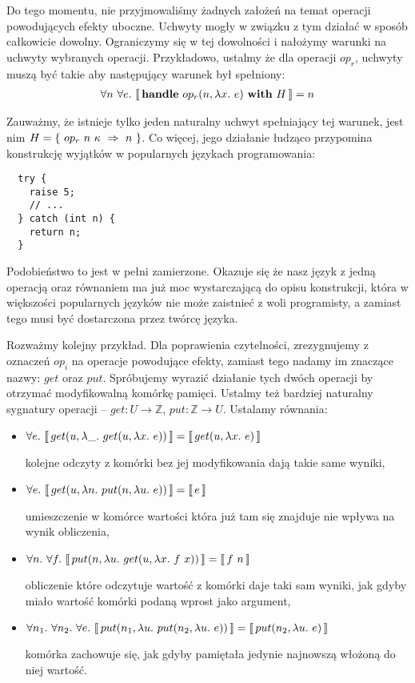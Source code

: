 \documentclass[shortabstract]{iithesis}
\begin{document}
Do tego momentu, nie przyjmowaliśmy żadnych założeń na temat operacji powodujących efekty uboczne. Uchwyty mogły w związku z tym działać w sposób całkowicie dowolny. Ograniczymy się w tej dowolności i nałożymy warunki na uchwyty wybranych operacji. Przykładowo, ustalmy że dla operacji \(op_r\), uchwyty muszą być takie aby następujący warunek był spełniony:
\begin{align}
  \forall n\ \forall e.\ \llbracket\, \mathbf{handle}\ op_r(n, \lambda x.\ e)\ \mathbf{with}\ H\, \rrbracket = n
\end{align}


Zauważmy, że istnieje tylko jeden naturalny uchwyt spełniający tej warunek, jest nim \(H = \{\ \hcase{op_r}{n\ \kappa}{n} \ \}\). Co więcej, jego działanie łudząco przypomina konstrukcję wyjątków w popularnych językach programowania:

\begin{lstlisting}
  try {
    raise 5;
    // ...
  } catch (int n) {
    return n;
  }
\end{lstlisting}

Podobieństwo to jest w pełni zamierzone. Okazuje się że nasz język z jedną operacją oraz równaniem ma już moc wystarczającą do opisu konstrukcji, która w większości popularnych języków nie może zaistnieć z woli programisty, a zamiast tego musi być dostarczona przez twórcę języka.

Rozważmy kolejny przykład. Dla poprawienia czytelności, zrezygnujemy z oznaczeń \(op_i\) na operacje powodujące efekty, zamiast tego nadamy im znaczące nazwy: \(get\) oraz \(put\). Spróbujemy wyrazić działanie tych dwóch operacji by otrzymać modyfikowalną komórkę pamięci. Ustalmy też bardziej naturalny sygnatury operacji -- \(get: U \rightarrow \mathbb{Z}\), \(put: \mathbb{Z} \rightarrow U\). Ustalamy równania:

\begin{itemize}
\item \(\forall e.\ \llbracket\, get(u, \lambda \_.\ get(u, \lambda x.\ e))\, \rrbracket = \llbracket\, get(u, \lambda x.\ e)\, \rrbracket\)

  kolejne odczyty z komórki bez jej modyfikowania dają takie same wyniki,
\item \(\forall e.\ \llbracket\, get(u, \lambda n.\ put(n, \lambda u.\ e))\, \rrbracket = \llbracket\, e\, \rrbracket\)

  umieszczenie w komórce wartości która już tam się znajduje nie wpływa na wynik obliczenia,
\item \(\forall n.\ \forall f.\ \llbracket\, put(n, \lambda u.\ get(u, \lambda x.\ f\ x))\, \rrbracket = \llbracket\, f\ n\, \rrbracket\)

  obliczenie które odczytuje wartość z komórki daje taki sam wyniki, jak gdyby miało wartość komórki podaną wprost jako argument,
\item \(\forall n_1.\ \forall n_2.\ \forall e.\ \llbracket\, put(n_1, \lambda u.\ put(n_2, \lambda u.\ e))\, \rrbracket = \llbracket\, put(n_2, \lambda u.\ e)\, \rrbracket\)

  komórka zachowuje się, jak gdyby pamiętała jedynie najnowszą włożoną do niej wartość.
\end{itemize}
\end{document}
